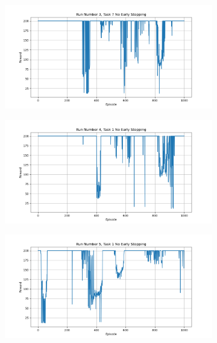 \documentclass[runningheads]{llncs}
\begin{document}
\begin{figure}[H]
\begin{subfigure}{.45\textwidth}
  \end{subfigure}
   \begin{subfigure}{.45\textwidth}
       \centering
       \includegraphics[width=1\textwidth] {imgs/no_early_stopping/Task_7_run_3_no_es}
   \end{subfigure}
    \begin{subfigure}{.45\textwidth}
        \centering
        \includegraphics[width=1\textwidth] {imgs/no_early_stopping/Task_1_run_4_no_es}
    \end{subfigure}
     \begin{subfigure}{.45\textwidth}
         \centering
         \includegraphics[width=1\textwidth] {imgs/no_early_stopping/Task_1_run_5_no_es}

\end{subfigure}
\end{figure}
\end{document}
